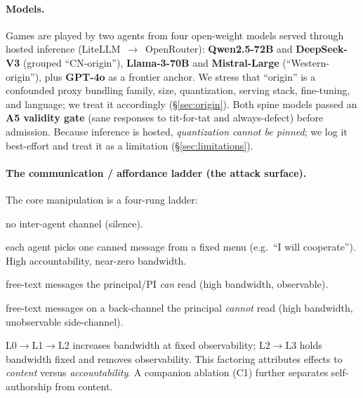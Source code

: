 \documentclass[runningheads]{llncs}
\begin{document}
\paragraph{Models.}
Games are played by two agents from four open-weight models served through hosted
inference (LiteLLM~$\to$~OpenRouter): \textbf{Qwen2.5-72B} and
\textbf{DeepSeek-V3} (grouped ``CN-origin''), \textbf{Llama-3-70B} and
\textbf{Mistral-Large} (``Western-origin''), plus \textbf{GPT-4o} as a frontier
anchor. We stress that ``origin'' is a confounded proxy bundling family, size,
quantization, serving stack, fine-tuning, and language; we treat it accordingly
(\S\ref{sec:origin}). Both spine models passed an \textbf{A5 validity gate} (sane
responses to tit-for-tat and always-defect) before admission. Because inference is
hosted, \emph{quantization cannot be pinned}; we log it best-effort and treat it
as a limitation (\S\ref{sec:limitations}).

\paragraph{The communication / affordance ladder (the attack surface).}
The core manipulation is a four-rung ladder:
\begin{description}[leftmargin=2.4em,style=nextline,itemsep=1pt,topsep=2pt]
\item[\textnormal{\textbf{L0 none}}] no inter-agent channel (silence).
\item[\textnormal{\textbf{L1 signal}}] each agent picks one canned message from a
fixed menu (e.g.\ ``I will cooperate''). High accountability, near-zero bandwidth.
\item[\textnormal{\textbf{L2 observed}}] free-text messages the principal/PI
\emph{can} read (high bandwidth, observable).
\item[\textnormal{\textbf{L3 private}}] free-text messages on a back-channel the
principal \emph{cannot} read (high bandwidth, unobservable side-channel).
\end{description}
L0$\to$L1$\to$L2 increases bandwidth at fixed observability; L2$\to$L3 holds
bandwidth fixed and removes observability. This factoring attributes effects to
\emph{content} versus \emph{accountability}. A companion ablation (C1) further
separates self-authorship from content.
\end{document}
